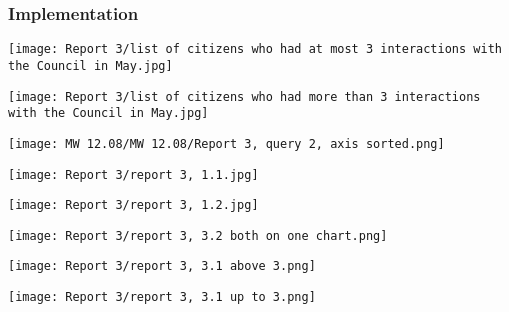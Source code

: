 			\subsubsection{Implementation}
			
			
\begin{center}
  \texttt{[image: Report 3/list of citizens who had at most 3 interactions with the Council in May.jpg]}
  \label{normal_case}
\end{center}
			

\begin{center}
  \texttt{[image: Report 3/list of citizens who had more than 3 interactions with the Council in May.jpg]}
  \label{normal_case}
\end{center}



\begin{center}
  \texttt{[image: MW 12.08/MW 12.08/Report 3, query 2, axis sorted.png]}
  \label{normal_case}
\end{center}


\begin{center}
  \texttt{[image: Report 3/report 3, 1.1.jpg]}
  \label{normal_case}
\end{center}



\begin{center}
  \texttt{[image: Report 3/report 3, 1.2.jpg]}
  \label{normal_case}
\end{center}


\begin{center}
  \texttt{[image: Report 3/report 3, 3.2 both on one chart.png]}
  \label{normal_case}
\end{center}


\begin{center}
  \texttt{[image: Report 3/report 3, 3.1 above 3.png]}
  \label{normal_case}
\end{center}


\begin{center}
  \texttt{[image: Report 3/report 3, 3.1 up to 3.png]}
  \label{normal_case}
\end{center}


